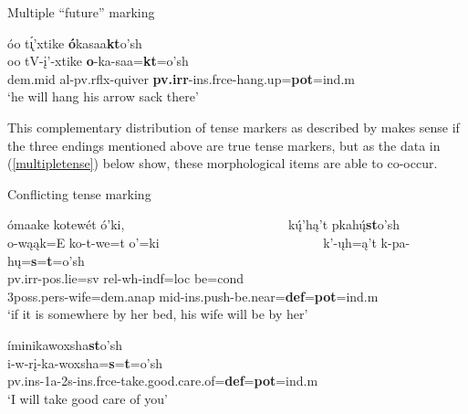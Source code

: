 \begin{exe}

\item\label{lotsoffuture} Multiple ``future'' marking

	\glll óo t\'{ı̨}'xtike \textbf{ó}kasaa\textbf{kt}o'sh\\
		oo tV-į'-xtike \textbf{o}-ka-saa=\textbf{kt}=o'sh\\
		dem.mid al-pv.rflx-\textnormal{quiver} \textbf{pv.irr}-ins.frce-\textnormal{hang.up}=\textbf{pot}=ind.m\\
	\glt	`he will hang his arrow sack there' \citep[116]{hollow1973a}

\end{exe}

This complementary distribution of tense markers as described by \citet{hollow1970} makes sense if the three endings mentioned above are true tense markers, but as the data in (\ref{multipletense}) below show, these morphological items are able to co-occur. 

\begin{exe}
\item\label{multipletense} Conflicting tense marking

	\begin{xlist}
	
	\item \glll ómaake kotewét ó'ki, ~ ~ ~ ~ ~ ~ ~ ~ ~ ~ ~ ~ ~ ~ ~  kų́'hą't pkahų́\textbf{st}o'sh\\
	o-wąąk=E ko-t-we=t o'=ki ~ ~ ~ ~ ~ ~ ~ ~ ~ ~ ~ ~ ~ ~ ~   k'-ųh=ą't k-pa-hų=\textbf{s}=\textbf{t}=o'sh\\
	pv.irr-pos.lie=sv rel-wh-indf=loc \textnormal{be}=cond ~ ~ ~ ~ ~ ~ ~ ~ ~ ~ ~ ~ ~ ~ ~ 3poss.pers-\textnormal{wife}=dem.anap mid-ins.push-\textnormal{be.near}=\textbf{def}=\textbf{pot}=ind.m\\
	\glt `if it is somewhere by her bed, his wife will be by her' \citep[117]{hollow1973a}

	\item \glll íminikawoxsha\textbf{st}o'sh\\
	i-w-rį-ka-woxsha=\textbf{s}=\textbf{t}=o'sh\\
	pv.ins-1a-2s-ins.frce-\textnormal{take.good.care.of}=\textbf{def}=\textbf{pot}=ind.m\\
	\glt `I will take good care of you' \citep[14]{trechter2012b}
	
	\end{xlist}

\end{exe}

